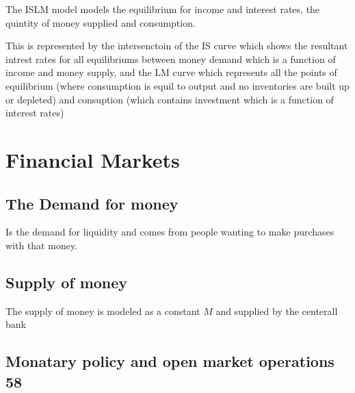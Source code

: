 \documentclass{tufte-book}
\begin{document}
The ISLM model models the equilibrium for income and interest rates, the
quintity of money supplied and consumption.

This is represented by the intersenctoin of the IS curve which shows the
resultant intrest rates for all equilibriums between money demand which
is a function of income and money supply, and the LM curve which
represents all the points of equilibrium (where consumption is equil to
output and no inventories are built up or depleted) and consuption
(which contains investment which is a function of interest rates)\hypertarget{financial-markets}{%
\section{Financial Markets}\label{financial-markets}}

\hypertarget{the-demand-for-money}{%
\subsection{The Demand for money}\label{the-demand-for-money}}

Is the demand for liquidity and comes from people wanting to make
purchases with that money.

\hypertarget{supply-of-money}{%
\subsection{Supply of money}\label{supply-of-money}}

The supply of money is modeled as a constant \(M\) and supplied by the
centerall bank

\hypertarget{monatary-policy-and-open-market-operations-58}{%
\subsection{Monatary policy and open market operations
58}\label{monatary-policy-and-open-market-operations-58}}
\end{document}
